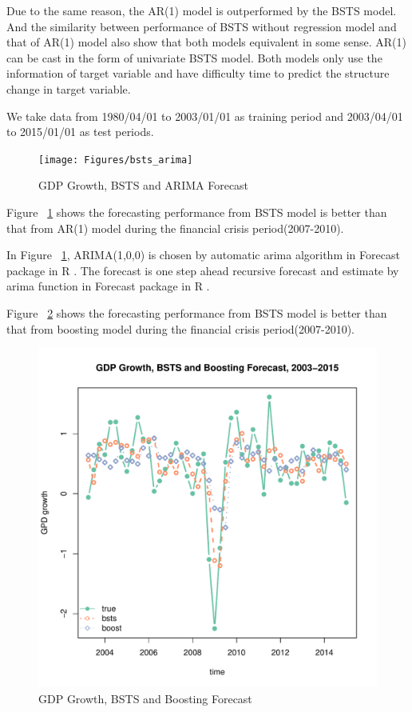 Due to the same reason, the AR(1) model is outperformed by the BSTS model. And the similarity between performance of BSTS without regression model and that of AR(1) model also show that both models equivalent in some sense. AR(1) can be cast in the form of univariate BSTS model. Both models only use the information of target variable and have difficulty time to predict the structure change in target variable.





We take data from 1980/04/01 to 2003/01/01 as training period and 2003/04/01 to 2015/01/01 as test periods. 



\begin{figure}[h]
\centering
\texttt{[image: Figures/bsts\_arima]}
\caption{GDP Growth, BSTS and ARIMA Forecast}
\label{fig:comparison}
\end{figure}




Figure ~\ref{fig:comparison} shows the forecasting performance from BSTS model is better than that from AR(1) model during the financial crisis period(2007-2010). 




In Figure ~\ref{fig:comparison}, ARIMA(1,0,0) is chosen by automatic arima algorithm in Forecast package in R \cite{Hyndman2015}. The forecast is one step ahead recursive forecast and estimate by arima function in Forecast package in R \cite{Hyndman2015}.  




Figure ~\ref{fig:bsts_boost} shows the forecasting performance from BSTS model is better than that from boosting model during the financial crisis period(2007-2010). 

\begin{figure}[h]
\centering
\includegraphics[width=0.7\linewidth]{Figures/bsts_boost}
\caption{GDP Growth, BSTS and Boosting Forecast}
\label{fig:bsts_boost}
\end{figure}



